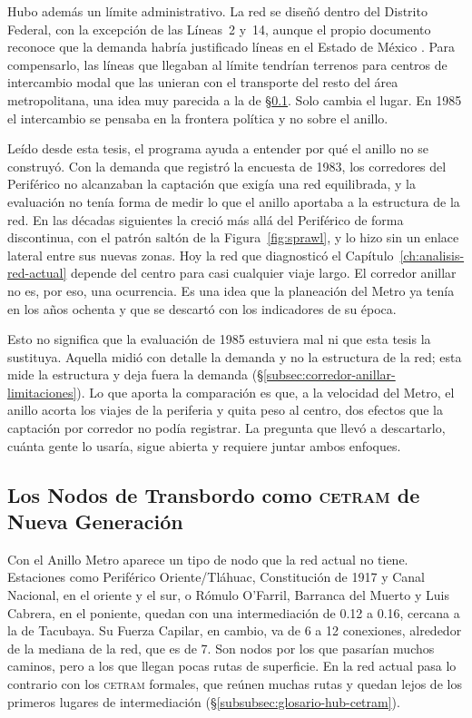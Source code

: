Hubo además un límite administrativo. La red se diseñó dentro del Distrito
Federal, con la excepción de las Líneas~2 y~14, aunque el propio documento
reconoce que la demanda habría justificado líneas en el Estado de México
\citep[p.~66]{ddf1985programa}. Para compensarlo, las líneas que llegaban al
límite tendrían terrenos para centros de intercambio modal que las unieran con
el transporte del resto del área metropolitana, una idea muy parecida a la de
§\ref{subsec:anillo-conclusiones-cetram}. Solo cambia el lugar. En 1985 el
intercambio se pensaba en la frontera política y no sobre el anillo.

Leído desde esta tesis, el programa ayuda a entender por qué el anillo no se
construyó. Con la demanda que registró la encuesta de 1983, los corredores del
Periférico no alcanzaban la captación que exigía una red equilibrada, y la
evaluación no tenía forma de medir lo que el anillo aportaba a la estructura de
la red. En las décadas siguientes la \zmvm{} creció más allá del Periférico de
forma discontinua, con el patrón saltón de la Figura~\ref{fig:sprawl}, y lo
hizo sin un enlace lateral entre sus nuevas zonas. Hoy la red que diagnosticó
el Capítulo~\ref{ch:analisis-red-actual} depende del centro para casi cualquier
viaje largo. El corredor anillar no es, por eso, una ocurrencia. Es una idea
que la planeación del Metro ya tenía en los años ochenta y que se descartó con
los indicadores de su época.

Esto no significa que la evaluación de 1985 estuviera mal ni que esta tesis la
sustituya. Aquella midió con detalle la demanda y no la estructura de la red;
esta mide la estructura y deja fuera la demanda
(§\ref{subsec:corredor-anillar-limitaciones}). Lo que aporta la comparación es
que, a la velocidad del Metro, el anillo acorta los viajes de la periferia y
quita peso al centro, dos efectos que la captación por corredor no podía
registrar. La pregunta que llevó a descartarlo, cuánta gente lo usaría, sigue
abierta y requiere juntar ambos enfoques.

\subsection{Los Nodos de Transbordo como \textsc{cetram} de Nueva Generación}
\label{subsec:anillo-conclusiones-cetram}

Con el Anillo Metro aparece un tipo de nodo que la red actual no tiene.
Estaciones como Periférico Oriente/Tláhuac, Constitución de 1917 y Canal
Nacional, en el oriente y el sur, o Rómulo O'Farril, Barranca del Muerto y Luis
Cabrera, en el poniente, quedan con una intermediación de 0.12 a 0.16, cercana a
la de Tacubaya. Su Fuerza Capilar, en cambio, va de 6 a 12 conexiones,
alrededor de la mediana de la red, que es de 7. Son nodos por los que pasarían
muchos caminos, pero a los que llegan pocas rutas de superficie. En la red
actual pasa lo contrario con los \textsc{cetram} formales, que reúnen muchas
rutas y quedan lejos de los primeros lugares de intermediación
(§\ref{subsubsec:glosario-hub-cetram}).

